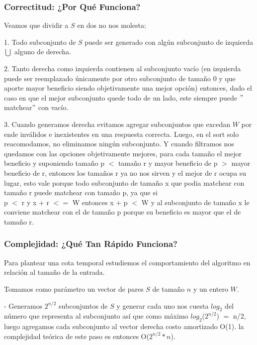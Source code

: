 \documentclass[a4paper]{article}
\begin{document}
\subsubsection{Correctitud: ¿Por Qué Funciona?}

Veamos que dividir a $S$ en dos no nos molesta:

1. Todo subconjunto de $S$ puede ser generado con algún subconjunto de izquierda $\bigcup$ alguno de derecha.

2. Tanto derecha como izquierda contienen al subconjunto vacío (en izquierda puede ser reemplazado únicamente por otro subconjunto de tamaño 0 y que aporte mayor beneficio siendo objetivamente una mejor opción) entonces, dado el caso en que el mejor subconjunto quede todo de un lado, este siempre puede $"$matchear$"$  con vacío.

3. Cuando generamos derecha evitamos agregar subconjuntos que excedan $W$ por ende inválidos e inexistentes en una respuesta correcta. Luego, en el sort solo reacomodamos, no eliminamos ningún subconjunto. Y cuando filtramos nos quedamos con las opciones objetivamente mejores, para cada tamaño el mejor beneficio y suponiendo tamaño p $<$ tamaño r y mayor beneficio de p $>$ mayor beneficio de r, entonces los tamaños r ya no nos sirven y el mejor de r ocupa su lugar, esto vale porque todo subconjunto de tamaño x que podia matchear con tamaño r puede matchear con tamaño p, ya que si \\ 
p $<$ r y x + r $<=$ W entonces x + p $<$ W y al subconjunto de tamaño x le conviene matchear con el de tamaño p porque su beneficio es mayor que el de tamaño r.

\break

\subsubsection{Complejidad: ¿Qué Tan Rápido Funciona?}

Para plantear una cota temporal estudiemos el comportamiento del algoritmo en relación al tamaño de la entrada.

Tomamos como parámetro un vector de pares $S$ de tamaño $n$ y un entero $W$. 

- Generamos $2^{n/2}$ subconjuntos de $S$ y generar cada uno nos cuesta $log_2$ del número que representa al subconjunto así que como máximo $log_2$($2^{n/2}$) $=$ n/2, luego agregamos cada subconjunto al vector derecha costo amortizado O(1). la complejidad teórica de este paso es entonces O($2^{n/2}*n$).
\end{document}
